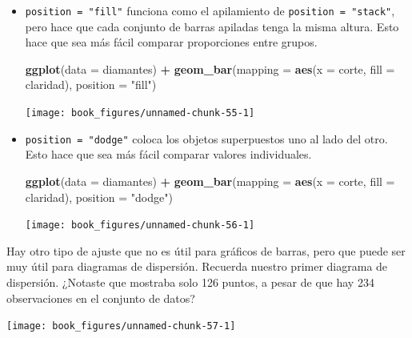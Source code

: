 \documentclass[11pt,oneside]{report}
\newenvironment{Shaded}{\begin{snugshade}}{\end{snugshade}}
\newcommand{\DataTypeTok}[1]{\textcolor[rgb]{0.13,0.29,0.53}{#1}}
\newcommand{\KeywordTok}[1]{\textcolor[rgb]{0.13,0.29,0.53}{\textbf{#1}}}
\newcommand{\NormalTok}[1]{#1}
\newcommand{\OperatorTok}[1]{\textcolor[rgb]{0.81,0.36,0.00}{\textbf{#1}}}
\newcommand{\StringTok}[1]{\textcolor[rgb]{0.31,0.60,0.02}{#1}}
\begin{document}
\begin{itemize}
\item
  \texttt{position\ =\ "fill"} funciona como el apilamiento de
  \texttt{position\ =\ "stack"}, pero hace que cada conjunto de barras
  apiladas tenga la misma altura. Esto hace que sea más fácil comparar
  proporciones entre grupos.

\begin{Shaded}
\begin{Highlighting}[]
\KeywordTok{ggplot}\NormalTok{(}\DataTypeTok{data =}\NormalTok{ diamantes) }\OperatorTok{+}
\StringTok{  }\KeywordTok{geom_bar}\NormalTok{(}\DataTypeTok{mapping =} \KeywordTok{aes}\NormalTok{(}\DataTypeTok{x =}\NormalTok{ corte, }\DataTypeTok{fill =}\NormalTok{ claridad), }\DataTypeTok{position =} \StringTok{"fill"}\NormalTok{)}
\end{Highlighting}
\end{Shaded}

  \begin{center}\texttt{[image: book\_figures/unnamed-chunk-55-1]} \end{center}
\item
  \texttt{position\ =\ "dodge"} coloca los objetos superpuestos uno al
  lado del otro. Esto hace que sea más fácil comparar valores
  individuales.

\begin{Shaded}
\begin{Highlighting}[]
\KeywordTok{ggplot}\NormalTok{(}\DataTypeTok{data =}\NormalTok{ diamantes) }\OperatorTok{+}
\StringTok{  }\KeywordTok{geom_bar}\NormalTok{(}\DataTypeTok{mapping =} \KeywordTok{aes}\NormalTok{(}\DataTypeTok{x =}\NormalTok{ corte, }\DataTypeTok{fill =}\NormalTok{ claridad), }\DataTypeTok{position =} \StringTok{"dodge"}\NormalTok{)}
\end{Highlighting}
\end{Shaded}

  \begin{center}\texttt{[image: book\_figures/unnamed-chunk-56-1]} \end{center}
\end{itemize}

Hay otro tipo de ajuste que no es útil para gráficos de barras, pero que
puede ser muy útil para diagramas de dispersión. Recuerda nuestro primer
diagrama de dispersión. ¿Notaste que mostraba solo 126 puntos, a pesar
de que hay 234 observaciones en el conjunto de datos?

\begin{center}\texttt{[image: book\_figures/unnamed-chunk-57-1]} \end{center}
\end{document}
